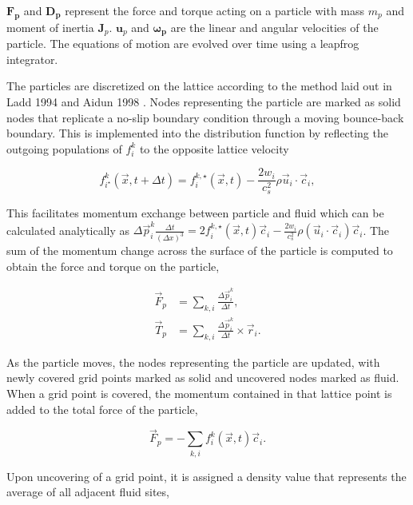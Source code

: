 $\mathbf{F_p}$ and $\mathbf{D_p}$ represent the force and torque acting on a particle with mass $m_p$ and moment of inertia 
$\mathbf{J}_p$. $\mathbf{u}_p$ and $\mathbf{\omega_{p}}$ are the linear and angular velocities of the particle. The equations of 
motion are evolved over time using a leapfrog integrator. \cite{jansen_bijels_2011}

The particles are discretized on the lattice according to the method laid out in Ladd 1994 and Aidun 1998
\cite{ladd_numerical_1994,aidun_direct_1998}. Nodes representing the particle are marked as solid nodes that replicate
a no-slip boundary condition through a moving bounce-back boundary. This is implemented into the distribution function
by reflecting the outgoing populations of $f_i^k$ to the opposite lattice velocity

\begin{equation}
    f^k_{i^\star}(\vec{x}, t+\Delta t) = f^{k,\star}_i(\vec{x}, t) - \frac{2w_i}{c_s^2} \rho \vec{u}_i \cdot \vec{c}_i ,
\end{equation}

This facilitates momentum exchange between particle and fluid which can be calculated analytically as 
\(\Delta\vec{p}^k_i \frac{\Delta t}{(\Delta x)^3} = 2 f^{k,\star}_i(\vec{x},t)\vec{c}_i - \frac{2w_i}{c_s^2}\rho(\vec{u}_i\cdot\vec{c}_i)\vec{c}_i\).
The sum of the momentum change across the surface of the particle is computed to obtain the force and torque on the particle,

\begin{equation}
    \begin{split}
    \vec{F}_p &= \sum_{k,i} \frac{\Delta \vec{p}^k_i}{\Delta t} , \\
    \vec{T}_p &= \sum_{k,i} \frac{\Delta\vec{p}^k_i}{\Delta t} \times \vec{r}_i .
    \end{split}
\end{equation}

As the particle moves, the nodes representing the particle are updated, with newly covered grid points marked as solid and 
uncovered nodes marked as fluid. When a grid point is covered, the momentum contained in that lattice point is added to the 
total force of the particle,

\begin{equation}
    \vec{F}_p = -\sum_{k,i} f_i^k(\vec{x},t)\vec{c}_i .
\end{equation}

Upon uncovering of a grid point, it is assigned a density value that represents the average of all adjacent fluid sites,

